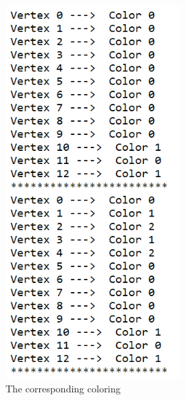 \begin{figure}[htbp]
\begin{minipage}[t]{0.48\textwidth}
\includegraphics[width=0.6\textwidth]{figure/coloring.png}
\caption{\footnotesize  The corresponding coloring}
\end{minipage}
\end{figure}

